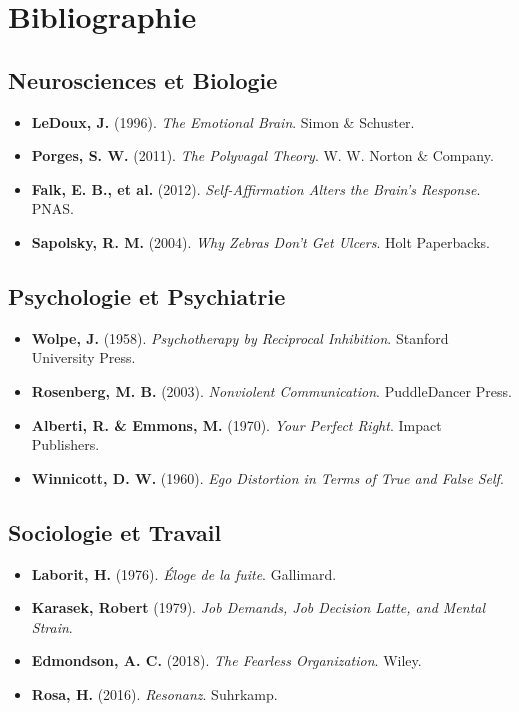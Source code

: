\chapter*{Bibliographie}

\section*{Neurosciences et Biologie}
\begin{itemize}
    \item \textbf{LeDoux, J.} (1996). \textit{The Emotional Brain}. Simon \& Schuster.
    \item \textbf{Porges, S. W.} (2011). \textit{The Polyvagal Theory}. W. W. Norton \& Company.
    \item \textbf{Falk, E. B., et al.} (2012). \textit{Self-Affirmation Alters the Brain's Response}. PNAS.
    \item \textbf{Sapolsky, R. M.} (2004). \textit{Why Zebras Don't Get Ulcers}. Holt Paperbacks.
\end{itemize}

\section*{Psychologie et Psychiatrie}
\begin{itemize}
    \item \textbf{Wolpe, J.} (1958). \textit{Psychotherapy by Reciprocal Inhibition}. Stanford University Press.
    \item \textbf{Rosenberg, M. B.} (2003). \textit{Nonviolent Communication}. PuddleDancer Press.
    \item \textbf{Alberti, R. \& Emmons, M.} (1970). \textit{Your Perfect Right}. Impact Publishers.
    \item \textbf{Winnicott, D. W.} (1960). \textit{Ego Distortion in Terms of True and False Self}.
\end{itemize}

\section*{Sociologie et Travail}
\begin{itemize}
    \item \textbf{Laborit, H.} (1976). \textit{Éloge de la fuite}. Gallimard.
    \item \textbf{Karasek, Robert} (1979). \textit{Job Demands, Job Decision Latte, and Mental Strain}.
    \item \textbf{Edmondson, A. C.} (2018). \textit{The Fearless Organization}. Wiley.
    \item \textbf{Rosa, H.} (2016). \textit{Resonanz}. Suhrkamp.
\end{itemize}
